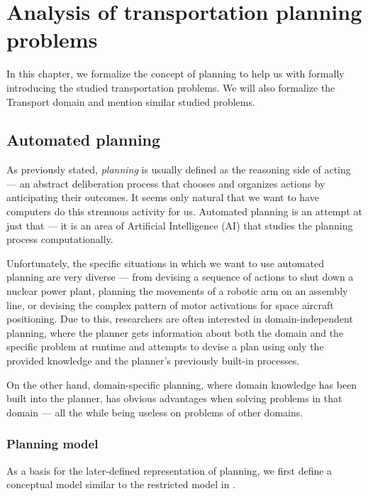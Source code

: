 \chapter{Analysis of transportation planning problems}

In this chapter, we formalize the concept of planning to help us with formally introducing the studied transportation problems. We will also formalize the Transport domain and mention similar studied problems.

\section{Automated planning}

As previously stated, \textit{planning} is usually defined as the reasoning side of acting --- an abstract deliberation
process that chooses and organizes actions by anticipating their outcomes. \citep[Section~1.1]{Ghallab2004}
It seems only natural that we want to have computers do this strenuous activity for us.
Automated planning is an attempt at just that --- it is an area of Artificial Intelligence (AI) that
studies the planning process computationally. \citep[Section~1.1]{Ghallab2004}

Unfortunately, the specific situations in which we want to use automated planning are very diverse
--- from devising a sequence of actions to shut down a nuclear power plant,
planning the movements of a robotic arm
on an assembly line, or devising the complex pattern of motor activations
for space aircraft positioning.
Due to this, researchers are often interested in domain-independent planning,
where the planner gets information
about both the domain and the specific problem at runtime and attempts to devise a plan using only the provided knowledge
and the planner's previously built-in processes. \citep[Section~1.3]{Ghallab2004}

On the other hand, domain-specific planning, where domain knowledge has been built into the planner,
has obvious advantages when solving problems in that domain --- all the while being useless on problems of other
domains. \citep[Section~1.3]{Ghallab2004}

\subsection{Planning model}

As a basis for the later-defined representation of planning, we first define
a conceptual model similar to the restricted model in \citep[Section~1.4, Section~1.5]{Ghallab2004}.

